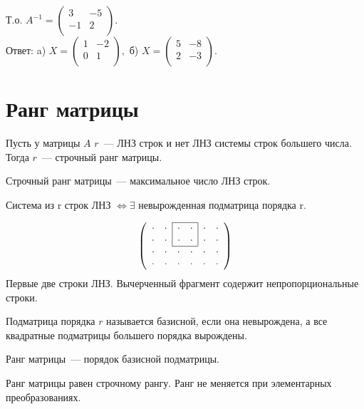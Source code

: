 Т.о. $A^{-1}=\left( \begin{array}{cc}
3 & -5\\
-1 & 2\\
\end{array} \right).
$\\
Ответ: a) $X=\left( \begin{array}{cc}
	1 & -2\\
	0 & 1\\
\end{array} \right),
$ б) $X=\left( \begin{array}{cc}
5 & -8\\
2 & -3\\
\end{array} \right).
$
\section{Ранг матрицы}
Пусть у матрицы $A$ $r$~--- ЛНЗ строк и нет ЛНЗ системы строк большего числа. Тогда $r$~--- строчный ранг матрицы.

\begin{definition}
	Строчный ранг матрицы~--- максимальное число ЛНЗ строк.
\end{definition}

\begin{theorem}
	Система из r строк ЛНЗ $\Leftrightarrow \exists$ невырожденная подматрица порядка r. 
\end{theorem}
$$
\left( \begin{array}{cccccc}\cline{3-4}
\cdot & \cdot & \multicolumn{1}{|c}{\cdot} & \cdot & \multicolumn{1}{|c}{\cdot} & \cdot\\
\cdot & \cdot & \multicolumn{1}{|c}{\cdot} & \cdot & \multicolumn{1}{|c}{\cdot} & \cdot\\ \cline{3-4}
\cdot & \cdot & \cdot & \cdot & \cdot & \cdot\\
\cdot & \cdot & \cdot & \cdot & \cdot & \cdot\\
\end{array} \right)
$$
Первые две строки ЛНЗ. Вычерченный фрагмент содержит непропорциональные строки.

\begin{definition}
Подматрица порядка $r$ называется базисной, если она невырождена, а все квадратные подматрицы большего порядка вырождены. 
\end{definition}
\begin{definition}
	Ранг матрицы~--- порядок базисной подматрицы.
\end{definition}
Ранг матрицы равен строчному рангу. Ранг не меняется при элементарных преобразованиях.

